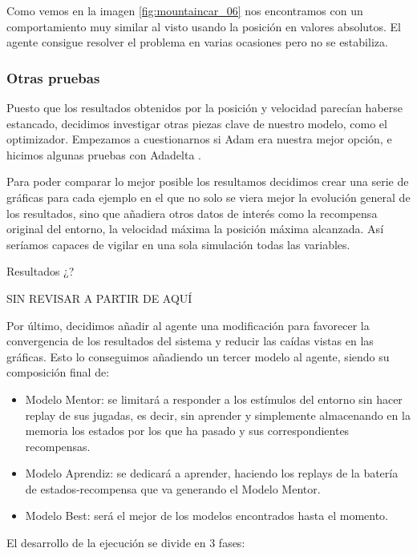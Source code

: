 Como vemos en la imagen \ref{fig:mountaincar_06} nos encontramos con un comportamiento muy similar al visto usando la posición en valores absolutos. El agente consigue resolver el problema en varias ocasiones pero no se estabiliza.



\subsubsection*{Otras pruebas}

Puesto que los resultados obtenidos por la posición y velocidad parecían haberse estancado, decidimos investigar otras piezas clave de nuestro modelo, como el optimizador. Empezamos a cuestionarnos si Adam \citep{kingma2014adam} era nuestra mejor opción, e hicimos algunas pruebas con Adadelta \citep{NIPS2017_7003}.

Para poder comparar lo mejor posible los resultamos decidimos crear una serie de gráficas para cada ejemplo en el que no solo se viera mejor la evolución general de los resultados, sino que añadiera otros datos de interés como la recompensa original del entorno, la velocidad máxima la posición máxima alcanzada. Así seríamos capaces de vigilar en una sola simulación todas las variables.

%
       {Resultados ¿?}

SIN REVISAR A PARTIR DE AQUÍ

Por último, decidimos añadir al agente una modificación para favorecer la convergencia de los resultados del sistema y reducir las caídas vistas en las gráficas.
Esto lo conseguimos añadiendo un tercer modelo al agente, siendo su composición final de:
\begin{itemize}
 \item Modelo Mentor: se limitará a responder a los estímulos del entorno sin hacer replay de sus jugadas, es decir, sin aprender y simplemente almacenando en la memoria los estados por los que ha pasado y sus correspondientes recompensas.
 \item Modelo Aprendiz: se dedicará a aprender, haciendo los replays de la batería de estados-recompensa que va generando el Modelo Mentor.
 \item Modelo Best: será el mejor de los modelos encontrados hasta el momento. 
\end{itemize}
El desarrollo de la ejecución se divide en 3 fases:

